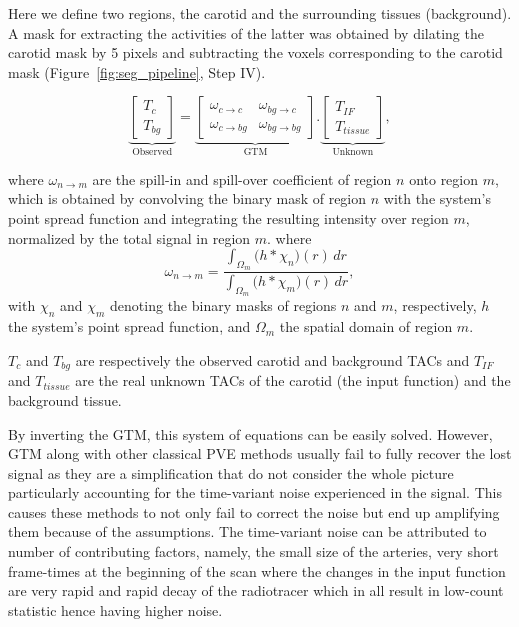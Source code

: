 Here we define two regions, the carotid and the surrounding tissues (background).
A mask for extracting the activities of the latter was obtained by dilating the carotid mask by 5 pixels and subtracting the voxels corresponding to the carotid mask (Figure~\ref{fig:seg_pipeline}, Step IV).

\begin{equation}
	\underbrace{
		\begin{bmatrix}
			T_{c} \\
			T_{bg}
		\end{bmatrix}
	}_{\text{Observed}}
	=
	\underbrace{
		\begin{bmatrix}
			\omega_{c \rightarrow c}  & \omega_{bg \rightarrow c}  \\
			\omega_{c \rightarrow bg} & \omega_{bg \rightarrow bg}
		\end{bmatrix}
	}_{\text{GTM}}
	.
	\underbrace{
		\begin{bmatrix}
			T_{IF} \\
			T_{tissue}
		\end{bmatrix}
	}_{\text{Unknown}},
\end{equation}

where $\omega_{n \rightarrow m}$ are the spill-in and spill-over coefficient of region $n$ onto region $m$, which is obtained by convolving the binary mask of region $n$ with the system's point spread function and integrating the resulting intensity over region $m$, normalized by the total signal in region $m$.
where
\begin{equation}
	\omega_{n\to m} = \frac{\displaystyle \int_{\Omega_m} \bigl( h \ast \chi_n \bigr)(r)\,dr}{\displaystyle \int_{\Omega_m} \bigl( h \ast \chi_m \bigr)(r)\,dr},
\end{equation}
with \(\chi_n\) and \(\chi_m\) denoting the binary masks of regions \(n\) and \(m\), respectively, \(h\) the system's point spread function, and \(\Omega_m\) the spatial domain of region \(m\).

$T_{c}$ and $T_{bg}$ are respectively the observed carotid and background TACs and $T_{IF}$ and $T_{tissue}$ are the real unknown TACs of the carotid (the input function) and the background tissue.

By inverting the GTM, this system of equations can be easily solved.
However, GTM along with other classical PVE methods usually fail to fully recover the lost signal as they are a simplification that do not consider the whole picture particularly accounting for the time-variant noise experienced in the signal.
This causes these methods to not only fail to correct the noise but end up amplifying them because of the assumptions.
The time-variant noise can be attributed to number of contributing factors, namely, the small size of the arteries, very short frame-times at the beginning of the scan where the changes in the input function are very rapid and rapid decay of the radiotracer which in all result in low-count statistic hence having higher noise.

